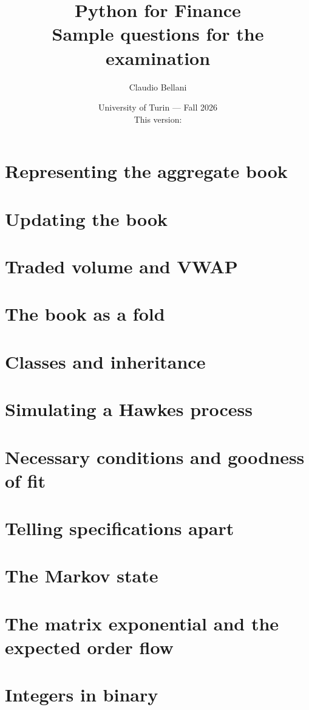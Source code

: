 \documentclass{unito26questions}
\title{Python for Finance\\[1ex] \large Sample questions for the examination}
\author{Claudio Bellani}
\date{University of Turin --- Fall 2026\\[1ex] This version: \compilationDate}
\begin{document}
\maketitle

\tableofcontents
\clearpage

\section{Representing the aggregate book}
\label{sec.representingTheBook}


\section{Updating the book}
\label{sec.updatingTheBook}


\section{Traded volume and VWAP}
\label{sec.vwap}


\section{The book as a fold}
\label{sec.foldingTheStream}


\section{Classes and inheritance}
\label{sec.inheritance}


\section{Simulating a Hawkes process}
\label{sec.simulatingHawkes}


\section{Necessary conditions and goodness of fit}
\label{sec.goodnessOfFit}


\section{Telling specifications apart}
\label{sec.tellingSpecificationsApart}


\section{The Markov state}
\label{sec.markovState}


\section{The matrix exponential and the expected order flow}
\label{sec.matrixExponential}


\section{Integers in binary}
\label{sec.binaryTricks}


\printkey
\end{document}
